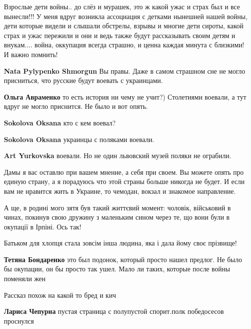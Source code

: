 \begin{itemize}

Взрослые дети войны.. до слёз и мурашек, это ж какой ужас и страх был и все
вынесли!!! У меня вдруг возникла ассоциация с детками нынешней нашей войны,
дети которые видели и слышали обстрелы, взрывы и многие дети сироты, какой
страх и ужас пережили и они и ведь также будут рассказывать своим детям и
внукам.... война, оккупация всегда страшно, и ценна каждая минута с близкими! И
важно помнить!

\begin{itemize} %
\textbf{Nata Pylypenko Shmorgun} Вы правы. Даже в самом страшном сне не могло присниться, что русские будут воевать с украинцами.

\textbf{Ольга Авраменко} то есть история ни чему не учит?) Столетиями воевали, а тут вдруг не могло приснится.
Не было и вот опять.

\textbf{Sokolova Oksana} кто с кем воевал?

\textbf{Sokolova Oksana} украинцы с поляками воевали.

\textbf{Art Yurkovska} воевали. Но не один львовский музей поляки не ограбили.

Дамы я вас оставлю при вашем мнение, а себя при своем.
Вы можете опять про единую страну, а я порадуюсь что этой страны больше никогда не будет.
И если вам не нравится жить в Украине, то чемодан, вокзал и знакомое направление.
\end{itemize} %


А ще, в родині мого зятя був такий життєвий момент: чоловік, військовий в
чинах, покинув свою дружину з маленьким сином через те, що вони були в окупації
в Ірпіні. Ось так!

Батьком для хлопця стала зовсім інша людина, яка і дала йому своє прізвище!

\textbf{Тетяна Бондаренко} это был подонок, который просто нашел предлог. Не было бы окупации, он бы просто так ушел. Мало ли таких, которые после войны поменяли жен

Рассказ похож на какой то бред и кич

\begin{itemize} %
\textbf{Лариса Чепурна} пустая страница с полупустой спорит.полк победосесов проснулся


\end{itemize}
\end{itemize}
